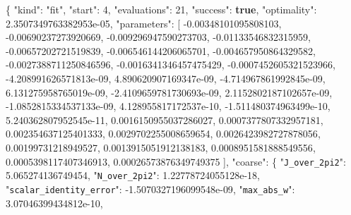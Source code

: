 \documentclass[
  10pt,
]{article}
\newenvironment{Shaded}{}{}
\newcommand{\DataTypeTok}[1]{\textcolor[rgb]{0.56,0.13,0.00}{#1}}
\newcommand{\DecValTok}[1]{\textcolor[rgb]{0.25,0.63,0.44}{#1}}
\newcommand{\FloatTok}[1]{\textcolor[rgb]{0.25,0.63,0.44}{#1}}
\newcommand{\FunctionTok}[1]{\textcolor[rgb]{0.02,0.16,0.49}{#1}}
\newcommand{\KeywordTok}[1]{\textcolor[rgb]{0.00,0.44,0.13}{\textbf{#1}}}
\newcommand{\OtherTok}[1]{\textcolor[rgb]{0.00,0.44,0.13}{#1}}
\newcommand{\StringTok}[1]{\textcolor[rgb]{0.25,0.44,0.63}{#1}}
\begin{document}
\begin{Shaded}
\begin{Highlighting}[]
\FunctionTok{\{}
  \DataTypeTok{"kind"}\FunctionTok{:} \StringTok{"fit"}\FunctionTok{,}
  \DataTypeTok{"start"}\FunctionTok{:} \DecValTok{4}\FunctionTok{,}
  \DataTypeTok{"evaluations"}\FunctionTok{:} \DecValTok{21}\FunctionTok{,}
  \DataTypeTok{"success"}\FunctionTok{:} \KeywordTok{true}\FunctionTok{,}
  \DataTypeTok{"optimality"}\FunctionTok{:} \FloatTok{2.3507349763382953e{-}05}\FunctionTok{,}
  \DataTypeTok{"parameters"}\FunctionTok{:} \OtherTok{[}
    \FloatTok{{-}0.00348101095808103}\OtherTok{,}
    \FloatTok{{-}0.00690237273920669}\OtherTok{,}
    \FloatTok{{-}0.009296947590273703}\OtherTok{,}
    \FloatTok{{-}0.01133546832315959}\OtherTok{,}
    \FloatTok{{-}0.00657202721519839}\OtherTok{,}
    \FloatTok{{-}0.006546144206065701}\OtherTok{,}
    \FloatTok{{-}0.004657950864329582}\OtherTok{,}
    \FloatTok{{-}0.0027388711250846596}\OtherTok{,}
    \FloatTok{{-}0.0016341346457475429}\OtherTok{,}
    \FloatTok{{-}0.0007452605321523966}\OtherTok{,}
    \FloatTok{{-}4.208991626571813e{-}09}\OtherTok{,}
    \FloatTok{4.890620907169347e{-}09}\OtherTok{,}
    \FloatTok{{-}4.714967861992845e{-}09}\OtherTok{,}
    \FloatTok{6.131275958765019e{-}09}\OtherTok{,}
    \FloatTok{{-}2.4109659781730693e{-}09}\OtherTok{,}
    \FloatTok{2.1152802187102657e{-}09}\OtherTok{,}
    \FloatTok{{-}1.0852815334537133e{-}09}\OtherTok{,}
    \FloatTok{4.128955817172537e{-}10}\OtherTok{,}
    \FloatTok{{-}1.511480374963499e{-}10}\OtherTok{,}
    \FloatTok{5.240362807952545e{-}11}\OtherTok{,}
    \FloatTok{0.0016150955037286027}\OtherTok{,}
    \FloatTok{0.0007377807332957181}\OtherTok{,}
    \FloatTok{0.002354637125401333}\OtherTok{,}
    \FloatTok{0.0029702255008659654}\OtherTok{,}
    \FloatTok{0.0026423982727878056}\OtherTok{,}
    \FloatTok{0.00199731218949527}\OtherTok{,}
    \FloatTok{0.0013915051912138183}\OtherTok{,}
    \FloatTok{0.0008951581888549556}\OtherTok{,}
    \FloatTok{0.0005398117407346913}\OtherTok{,}
    \FloatTok{0.00026573876349749375}
  \OtherTok{]}\FunctionTok{,}
  \DataTypeTok{"coarse"}\FunctionTok{:} \FunctionTok{\{}
    \DataTypeTok{"\nolinkurl{J_over_2pi2}"}\FunctionTok{:} \FloatTok{5.065274136749454}\FunctionTok{,}
    \DataTypeTok{"\nolinkurl{N_over_2pi2}"}\FunctionTok{:} \FloatTok{1.22778724055128e{-}18}\FunctionTok{,}
    \DataTypeTok{"\nolinkurl{scalar_identity_error}"}\FunctionTok{:} \FloatTok{{-}1.5070327196099548e{-}09}\FunctionTok{,}
    \DataTypeTok{"\nolinkurl{max_abs_w}"}\FunctionTok{:} \FloatTok{3.07046399434812e{-}10}\FunctionTok{,}

\end{Highlighting}
\end{Shaded}
\end{document}
